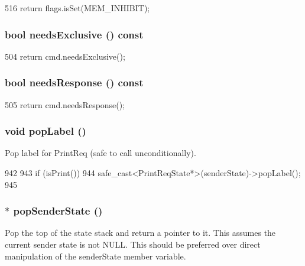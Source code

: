 \begin{DoxyCode}
516 { return flags.isSet(MEM_INHIBIT); }
\end{DoxyCode}
\hypertarget{classPacket_aa8e449288b878ff3ff7f286eb4d28b6a}{
\subsubsection[{needsExclusive}]{\setlength{\rightskip}{0pt plus 5cm}bool needsExclusive () const}}
\label{classPacket_aa8e449288b878ff3ff7f286eb4d28b6a}



\begin{DoxyCode}
504 { return cmd.needsExclusive(); }
\end{DoxyCode}
\hypertarget{classPacket_a390c6cced05593f0a2c75a38a7a24fa9}{
\subsubsection[{needsResponse}]{\setlength{\rightskip}{0pt plus 5cm}bool needsResponse () const}}
\label{classPacket_a390c6cced05593f0a2c75a38a7a24fa9}



\begin{DoxyCode}
505 { return cmd.needsResponse(); }
\end{DoxyCode}
\hypertarget{classPacket_a3ab6da7065be0d85f45a8dd050515f16}{
\subsubsection[{popLabel}]{\setlength{\rightskip}{0pt plus 5cm}void popLabel ()}}
\label{classPacket_a3ab6da7065be0d85f45a8dd050515f16}
Pop label for PrintReq (safe to call unconditionally). 


\begin{DoxyCode}
942     {
943         if (isPrint())
944             safe_cast<PrintReqState*>(senderState)->popLabel();
945     }
\end{DoxyCode}
\hypertarget{classPacket_a6f73d3ef605e592952b5586975161bfd}{
\subsubsection[{popSenderState}]{ $\ast$ popSenderState ()}}
\label{classPacket_a6f73d3ef605e592952b5586975161bfd}
Pop the top of the state stack and return a pointer to it. This assumes the current sender state is not NULL. This should be preferred over direct manipulation of the senderState member variable.

